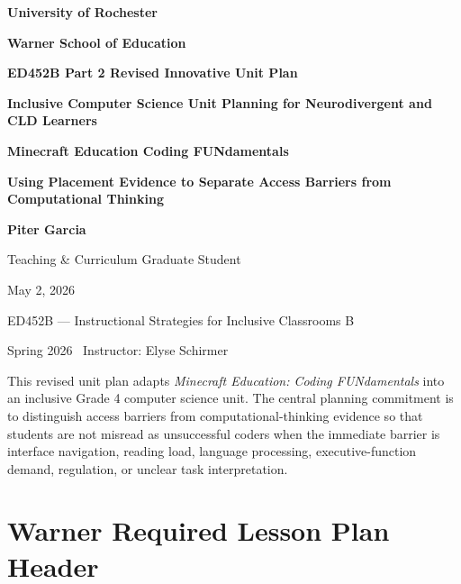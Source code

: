 \documentclass[12pt]{article}
\begin{document}
\begin{titlepage}
\thispagestyle{empty}
\centering
\vspace*{0.55in}
{\Large\bfseries University of Rochester\par}
{\large\bfseries Warner School of Education\par}
\vspace{0.65in}
{\LARGE\bfseries\color{navyBlue} ED452B Part 2 Revised Innovative Unit Plan\par}
\vspace{0.15in}
{\Large\bfseries Inclusive Computer Science Unit Planning for Neurodivergent and CLD Learners\par}
\vspace{0.25in}
{\large\textcolor{navyBlue}{\textbf{Minecraft Education Coding FUNdamentals}}\par}
{\large\textcolor{brickRed}{\textbf{Using Placement Evidence to Separate Access Barriers from Computational Thinking}}\par}
\vspace{0.7in}
{\large\textbf{Piter Garcia}\par}
{\large Teaching \& Curriculum Graduate Student\par}
\vspace{0.2in}
{\large May 2, 2026\par}
\vfill
{\large ED452B --- Instructional Strategies for Inclusive Classrooms B\par}
{\normalsize Spring 2026 \textperiodcentered\ Instructor: Elyse Schirmer\par}
\vspace{0.5in}
\begin{keybox}
This revised unit plan adapts \emph{Minecraft Education: Coding FUNdamentals} into an inclusive Grade 4 computer science unit. The central planning commitment is to distinguish access barriers from computational-thinking evidence so that students are not misread as unsuccessful coders when the immediate barrier is interface navigation, reading load, language processing, executive-function demand, regulation, or unclear task interpretation.
\end{keybox}
\end{titlepage}

\tableofcontents
\clearpage

\section{Warner Required Lesson Plan Header}
\end{document}
